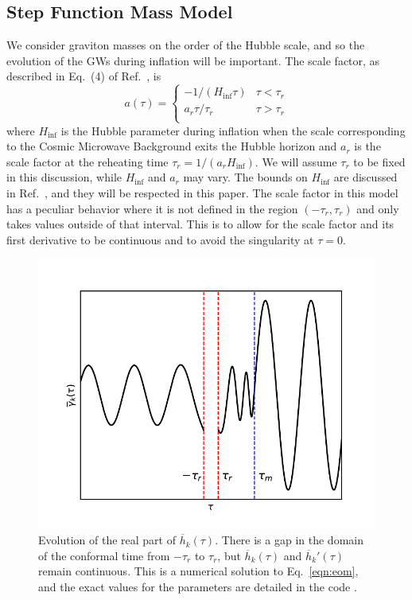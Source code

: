 \documentclass[prd,twocolumn,aps,psfig,nofootinbib,nobibnotes,superscriptaddress,preprintnumbers,times]{revtex4-2}
\begin{document}
\subsection{Step Function Mass Model}
We consider graviton masses on the order of the Hubble scale, and so the evolution of the GWs during inflation will be important.
The scale factor, as described in Eq.\ (4) of Ref.\ \cite{Fujita:2018}, is
\begin{equation}\label{eqn:scale_fac}
    a(\tau) = 
    \begin{cases}
        -1/(H_{\inf}\tau) & \tau < \tau_r \\
        a_r \tau/\tau_r & \tau > \tau_r \\
   \end{cases}
\end{equation}
where $H_{\inf}$ is the Hubble parameter during inflation when the scale corresponding to the Cosmic Microwave Background exits the Hubble horizon and $a_r$ is the scale factor at the reheating time $\tau_r = 1/(a_r H_{\inf})$. We will assume $\tau_r$ to be fixed in this discussion, while $H_{\inf}$ and $a_r$ may vary. The bounds on $H_{\inf}$ are discussed in Ref.\ \cite{Jiang:2017}, and they will be respected in this paper. The scale factor in this model has a peculiar behavior where it is not defined in the region $(-\tau_r, \tau_r)$ and only takes values outside of that interval. This is to allow for the scale factor and its first derivative to be continuous and to avoid the singularity at $\tau = 0$. %
\begin{figure}[ht]
    \includegraphics[scale=0.65]{fig/fig0.pdf}
    \caption{Evolution of the real part of $\overline{h}_k(\tau)$. There is a gap in the domain of the conformal time from $-\tau_r$ to $\tau_r$, but $\overline{h}_k(\tau)$ and $\overline{h}_k'(\tau)$ remain continuous. This is a numerical solution to Eq.\ \ref{eqn:eom}, and the exact values for the parameters are detailed in the code \cite{GH}.}
    \label{fig:mode}
\end{figure}
\end{document}
